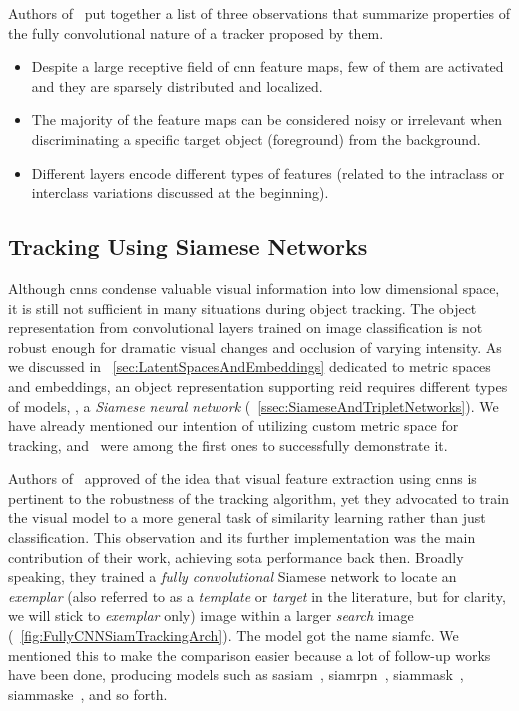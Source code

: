 Authors of~\cite{wang2015votcnn} put together a list of three observations that summarize properties of the fully convolutional nature of a tracker proposed by them.
\begin{itemize}
    \item Despite a large receptive field of \gls{cnn} feature maps, few of them are activated and they are sparsely distributed and localized.
    \item The majority of the feature maps can be considered noisy or irrelevant when discriminating a specific target object (foreground) from the background.
    \item Different layers encode different types of features (related to the intraclass or interclass variations discussed at the beginning).
\end{itemize}

\subsection{Tracking Using Siamese Networks}
\label{ssec:TrackingUsingSiameseNetworks}

Although \glspl{cnn} condense valuable visual information into low dimensional space, it is still not sufficient in many situations during object tracking. The object representation from convolutional layers trained on image classification is not robust enough for dramatic visual changes and occlusion of varying intensity. As we discussed in \sectiontext{}~\ref{sec:LatentSpacesAndEmbeddings} dedicated to metric spaces and embeddings, an object representation supporting \gls{reid} requires different types of models, \ietext{}, a \emph{Siamese neural network} (\sectiontext{}~\ref{ssec:SiameseAndTripletNetworks}). We have already mentioned our intention of utilizing custom metric space for tracking, and~\cite{bertinetto2016siamfc} were among the first ones to successfully demonstrate it.

Authors of~\cite{bertinetto2016siamfc} approved of the idea that visual feature extraction using \glspl{cnn} is pertinent to the robustness of the tracking algorithm, yet they advocated to train the visual model to a more general task of similarity learning rather than just classification. This observation and its further implementation was the main contribution of their work, achieving \gls{sota} performance back then. Broadly speaking, they trained a \emph{fully convolutional} Siamese network to locate an \emph{exemplar} (also referred to as a \emph{template} or \emph{target} in the literature, but for clarity, we will stick to \emph{exemplar} only) image within a larger \emph{search} image (\figtext{}~\ref{fig:FullyCNNSiamTrackingArch}). The model got the name \gls{siamfc}. We mentioned this to make the comparison easier because a lot of follow-up works have been done, producing models such as \gls{sasiam}~\cite{he2018twofoldsiam}, \gls{siamrpn}~\cite{li2018siamrpn}, \gls{siammask}~\cite{wang2019siammask}, \gls{siammaske}~\cite{chen2019rotbboxes}, and so forth.

